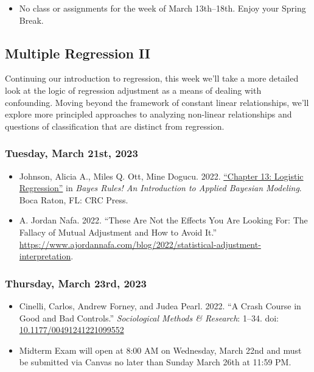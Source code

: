\documentclass[12pt,]{article}
\providecommand{\tightlist}{%
  \setlength{\itemsep}{0pt}\setlength{\parskip}{0pt}}
\begin{document}
\begin{itemize}
\tightlist
\item
  No class or assignments for the week of March 13th--18th. Enjoy your
  Spring Break.
\end{itemize}

\hypertarget{multiple-regression-ii}{%
\subsection{Multiple Regression II}\label{multiple-regression-ii}}

\noindent Continuing our introduction to regression, this week we'll
take a more detailed look at the logic of regression adjustment as a
means of dealing with confounding. Moving beyond the framework of
constant linear relationships, we'll explore more principled approaches
to analyzing non-linear relationships and questions of classification
that are distinct from regression.

\hypertarget{tuesday-march-21st-2023}{%
\subsubsection{Tuesday, March 21st,
2023}\label{tuesday-march-21st-2023}}

\begin{itemize}
\item
  Johnson, Alicia A., Miles Q. Ott, Mine Dogucu. 2022.
  \href{https://www.bayesrulesbook.com/chapter-13.html}{``Chapter 13:
  Logistic Regression''} in \emph{Bayes Rules! An Introduction to
  Applied Bayesian Modeling}. Boca Raton, FL: CRC Press.
\item
  A. Jordan Nafa. 2022. ``These Are Not the Effects You Are Looking For:
  The Fallacy of Mutual Adjustment and How to Avoid It.''
  \url{https://www.ajordannafa.com/blog/2022/statistical-adjustment-interpretation}.
\end{itemize}

\hypertarget{thursday-march-23rd-2023}{%
\subsubsection{Thursday, March 23rd,
2023}\label{thursday-march-23rd-2023}}

\begin{itemize}
\item
  Cinelli, Carlos, Andrew Forney, and Judea Pearl. 2022. ``A Crash
  Course in Good and Bad Controls.'' \emph{Sociological Methods \&
  Research}: 1--34. doi:
  \href{https://doi.org/10.1177/00491241221099552}{10.1177/00491241221099552}
\item
  Midterm Exam will open at 8:00 AM on Wednesday, March 22nd and must be
  submitted via Canvas no later than Sunday March 26th at 11:59 PM.
\end{itemize}
\end{document}
